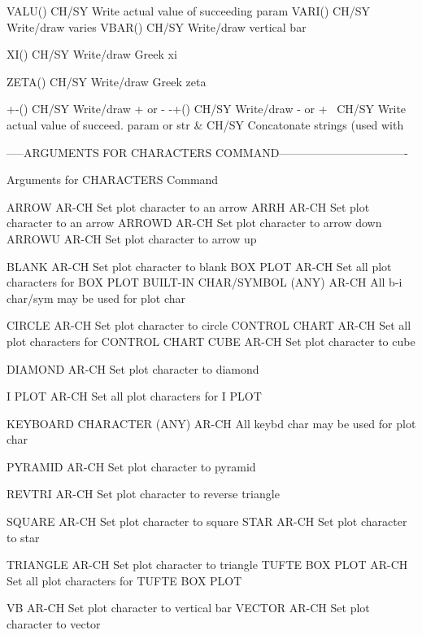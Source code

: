 VALU()                      CH/SY Write actual value of succeeding param
VARI()                      CH/SY Write/draw varies
VBAR()                      CH/SY Write/draw vertical bar

XI()                        CH/SY Write/draw Greek xi

ZETA()                      CH/SY Write/draw Greek zeta

+-()                        CH/SY Write/draw + or -
-+()                        CH/SY Write/draw - or +
\                           CH/SY Write actual value of succeed. param or str
&                           CH/SY Concatonate strings (used with \)

-----ARGUMENTS FOR CHARACTERS COMMAND----------------------------------

Arguments for CHARACTERS Command

ARROW                       AR-CH Set plot character to an arrow
ARRH                        AR-CH Set plot character to an arrow
ARROWD                      AR-CH Set plot character to arrow down
ARROWU                      AR-CH Set plot character to arrow up

BLANK                       AR-CH Set plot character to blank
BOX PLOT                    AR-CH Set all plot characters for BOX PLOT
BUILT-IN CHAR/SYMBOL (ANY)  AR-CH All b-i char/sym may be used for plot char

CIRCLE                      AR-CH Set plot character to circle
CONTROL CHART               AR-CH Set all plot characters for CONTROL CHART
CUBE                        AR-CH Set plot character to cube

DIAMOND                     AR-CH Set plot character to diamond

I PLOT                      AR-CH Set all plot characters for I PLOT

KEYBOARD CHARACTER (ANY)    AR-CH All keybd char may be used for plot char

PYRAMID                     AR-CH Set plot character to pyramid

REVTRI                      AR-CH Set plot character to reverse triangle

SQUARE                      AR-CH Set plot character to square
STAR                        AR-CH Set plot character to star

TRIANGLE                    AR-CH Set plot character to triangle
TUFTE BOX PLOT              AR-CH Set all plot characters for TUFTE BOX PLOT

VB                          AR-CH Set plot character to vertical bar
VECTOR                      AR-CH Set plot character to vector

